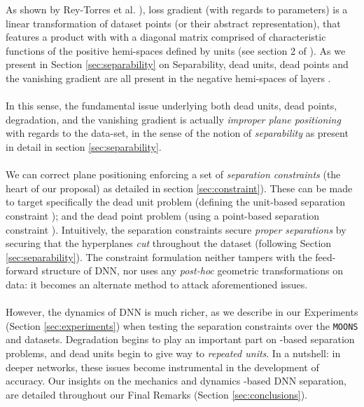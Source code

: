 As shown by Rey-Torres et al. \cite{reyRiera2019ModellingClassificationReLU}), loss gradient (with regards to parameters) is a linear transformation of dataset points (or their abstract representation), that features a product with with a diagonal matrix comprised of characteristic functions of the positive hemi-spaces defined by units (see section 2 of \cite{reyRiera2019ModellingClassificationReLU}). As we present in Section \ref{sec:separability} on Separability, dead units, dead points and the vanishing gradient are all present in the negative hemi-spaces of layers \cite{reyRiera2019ModellingClassificationReLU}. 
\\\\
In this sense, the fundamental issue underlying both dead units, dead points, degradation, and the vanishing gradient is actually \emph{improper plane positioning} with regards to the data-set, in the sense of the notion of \emph{separability} as present in detail in section \ref{sec:separability}. 
\\\\
We can correct plane positioning enforcing a set of \emph{separation constraints} (the heart of our proposal) as detailed in section \ref{sec:constraint}). These  can be made to target specifically the dead unit problem (defining the unit-based separation constraint \SepUnit); and the dead point problem (using a point-based separation constraint \SepPoint). Intuitively, the separation constraints secure \emph{proper separations} by securing that the hyperplanes \emph{cut} throughout the dataset (following Section \ref{sec:separability}). The constraint formulation neither tampers with the feed-forward structure of DNN, nor uses any \emph{post-hoc} geometric transformations on data: it becomes an alternate method to attack aforementioned issues. 
\\\\
However, the dynamics of \ReLU DNN is much richer, as we describe in our Experiments (Section \ref{sec:experiments}) when testing the separation constraints over the \texttt{MOONS} and  datasets. Degradation begins to play an important part on \ReLU-based separation problems, and dead units begin to give way to \emph{repeated units}. In a nutshell: in deeper networks, these issues become instrumental in the development of accuracy. Our insights on the mechanics and dynamics \ReLU-based DNN separation, are detailed throughout our Final Remarks (Section \ref{sec:conclusions}).  

